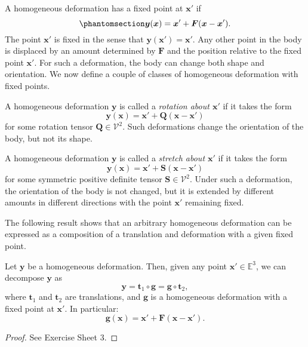\documentclass[
  letterpaper,
  DIV=11,
  numbers=noendperiod]{scrreprt}
\theoremstyle{plain}
\theoremstyle{remark}
\begin{document}
A homogeneous deformation has a fixed point at \({\boldsymbol{x}}'\) if
\begin{equation}\phantomsection\label{eq-defFixedPoint}{
  {\boldsymbol{y}}({\boldsymbol{x}}) = {\boldsymbol{x}}'+ {\boldsymbol{F}}({\boldsymbol{x}}-{\boldsymbol{x}}').
}\end{equation} The point \({\boldsymbol{x}}'\) is fixed in the sense
that \({\boldsymbol{y}}({\boldsymbol{x}}') = {\boldsymbol{x}}'\). Any
other point in the body is displaced by an amount determined by
\({\boldsymbol{F}}\) and the position relative to the fixed point
\({\boldsymbol{x}}'\). For such a deformation, the body can change both
shape and orientation. We now define a couple of classes of homogeneous
deformation with fixed points.

A homogeneous deformation \({\boldsymbol{y}}\) is called a
\emph{rotation about \({\boldsymbol{x}}'\)} if it takes the form
\[{\boldsymbol{y}}({\boldsymbol{x}})={\boldsymbol{x}}'+{\boldsymbol{Q}}({\boldsymbol{x}}-{\boldsymbol{x}}')\]
for some rotation tensor \({\boldsymbol{Q}}\in{\mathcal{V}}^2\). Such
deformations change the orientation of the body, but not its shape.

A homogeneous deformation \({\boldsymbol{y}}\) is called a \emph{stretch
about \({\boldsymbol{x}}'\)} if it takes the form
\[{\boldsymbol{y}}({\boldsymbol{x}})={\boldsymbol{x}}'+{\boldsymbol{S}}({\boldsymbol{x}}-{\boldsymbol{x}}')\]
for some symmetric positive definite tensor
\({\boldsymbol{S}}\in{\mathcal{V}}^2\). Under such a deformation, the
orientation of the body is not changed, but it is extended by different
amounts in different directions with the point \({\boldsymbol{x}}'\)
remaining fixed.

The following result shows that an arbitrary homogeneous deformation can
be expressed as a composition of a translation and deformation with a
given fixed point.

Let \({\boldsymbol{y}}\) be a homogeneous deformation. Then, given any
point \({\boldsymbol{x}}'\in{\mathbb{E}}^3\), we can decompose
\({\boldsymbol{y}}\) as
\[{\boldsymbol{y}}= {\boldsymbol{t}}_1\circ {\boldsymbol{g}}={\boldsymbol{g}}\circ{\boldsymbol{t}}_2,\]
where \({\boldsymbol{t}}_1\) and \({\boldsymbol{t}}_2\) are
translations, and \({\boldsymbol{g}}\) is a homogeneous deformation with
a fixed point at \({\boldsymbol{x}}'\). In particular:
\[{\boldsymbol{g}}({\boldsymbol{x}}) = {\boldsymbol{x}}'+{\boldsymbol{F}}({\boldsymbol{x}}-{\boldsymbol{x}}').\]

\begin{proof}
See Exercise Sheet 3.
\end{proof}
\end{document}
